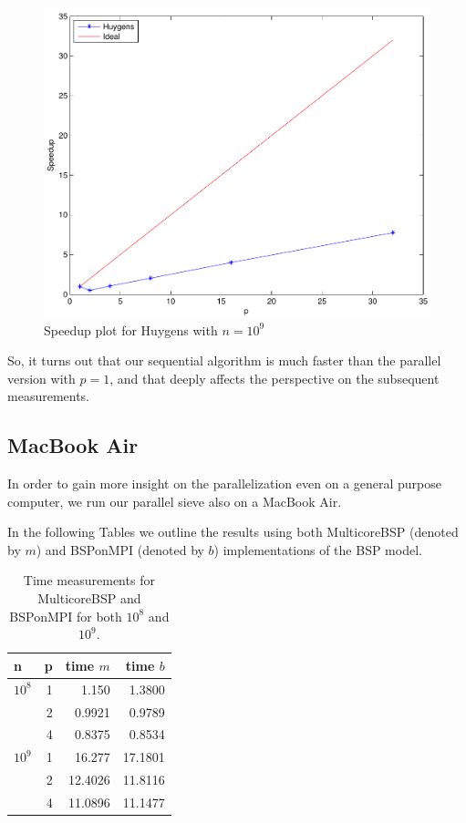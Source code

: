 \documentclass[a4paper,11pt]{article}
\begin{document}
\begin{figure}[H]
\begin{center}
\includegraphics[scale=0.6]{img/sp1e9-2}
\end{center}
\caption{Speedup plot for Huygens with $n=10^9$} \label{mb:2}
\end{figure}

So, it turns out that our sequential algorithm is much faster than the parallel version with $p=1$, and that deeply affects the perspective on the subsequent measurements.		


\subsection{MacBook Air}

In order to gain more insight on the parallelization even on a general purpose computer, we run our parallel sieve also on a MacBook Air.

In the following Tables we outline the results using both MulticoreBSP (denoted by $m$) and BSPonMPI (denoted by $b$) implementations of the BSP model.


\begin{table}[H]
\begin{center}
\begin{tabular}{|C{2.8cm}|r r r|}
\hline
\textbf{n} & p & time $m$  & time $b$ \\
\hline
$10^8$ & 1 &1.150   & 1.3800\\
&2 &0.9921 & 0.9789\\
&4 &0.8375 & 0.8534\\
\hline
$10^9$ &1 &16.277    &17.1801 \\  
&2 &12.4026   &11.8116\\
&4 &11.0896   &11.1477\\
\hline
\end{tabular}
\caption{Time measurements for MulticoreBSP and BSPonMPI for both $10^8$ and $10^9$.} \label{tab:mc_bspmpi}
\end{center}
\end{table}
\end{document}
